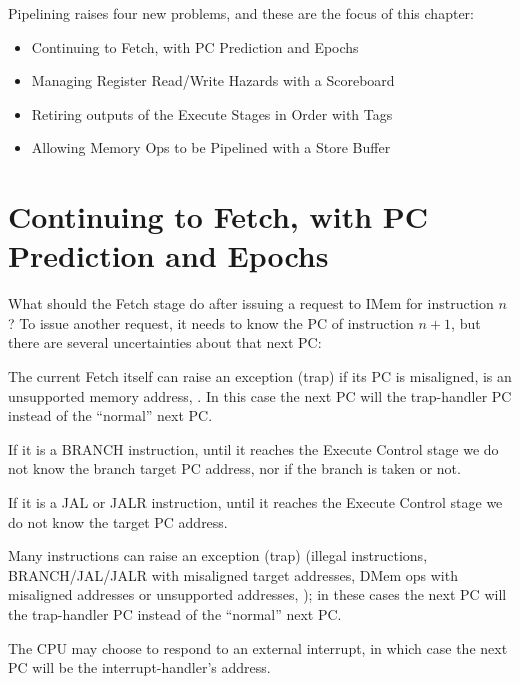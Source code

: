 Pipelining raises four new problems, and these are the focus of this
chapter:

\begin{itemize}

  \item Continuing to Fetch, with PC Prediction and Epochs

  \item Managing Register Read/Write Hazards with a Scoreboard

  \item Retiring outputs of the Execute Stages in Order with Tags

  \item Allowing Memory Ops to be Pipelined with a Store Buffer

\end{itemize}


\section{Continuing to Fetch, with PC Prediction and Epochs}

\label{Sec_Epochs}

What should the Fetch stage do after issuing a request to IMem for
instruction $n$?  To issue another request, it needs to know the PC of
instruction $n+1$, but there are several uncertainties about that next
PC:

\begin{tightlist}

 \item The current Fetch itself can raise an exception (trap) if its
        PC is misaligned, is an unsupported memory address, {\etc}.
        In this case the next PC will the trap-handler PC instead of
        the ``normal'' next PC.

 \item If it is a BRANCH instruction, until it reaches the Execute
       Control stage we do not know the branch target PC address, nor
       if the branch is taken or not.

 \item If it is a JAL or JALR instruction, until it reaches the
       Execute Control stage we do not know the target PC address.

 \item Many instructions can raise an exception (trap) (illegal
       instructions, BRANCH/JAL/JALR with misaligned target addresses,
       DMem ops with misaligned addresses or unsupported addresses,
       {\etc}); in these cases the next PC will the trap-handler PC
       instead of the ``normal'' next PC.

 \item The CPU may choose to respond to an external interrupt, in
        which case the next PC will be the interrupt-handler's
        address.

\end{tightlist}

